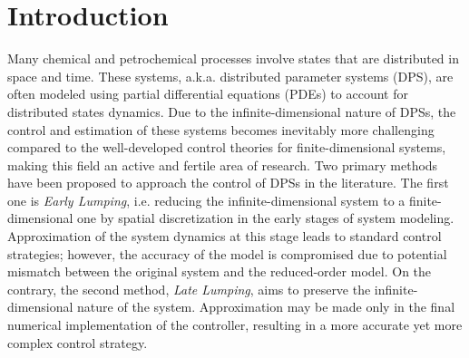 \section{Introduction}

Many chemical and petrochemical processes involve states that are distributed in space and time. These systems, a.k.a. distributed parameter systems (DPS), are often modeled using partial differential equations (PDEs) to account for distributed states dynamics. Due to the infinite-dimensional nature of DPSs, the control and estimation of these systems becomes inevitably more challenging compared to the well-developed control theories for finite-dimensional systems, \cite{ray1981advanced} making this field an active and fertile area of research. Two primary methods have been proposed to approach the control of DPSs in the literature. The first one is \textit{Early Lumping}, i.e. reducing the infinite-dimensional system to a finite-dimensional one by spatial discretization in the early stages of system modeling. \cite{davison1976robust} Approximation of the system dynamics at this stage leads to standard control strategies; however, the accuracy of the model is compromised due to potential mismatch between the original system and the reduced-order model. \cite{moghadam2012infinite} On the contrary, the second method, \textit{Late Lumping}, aims to preserve the infinite-dimensional nature of the system. Approximation may be made only in the final numerical implementation of the controller, resulting in a more accurate yet more complex control strategy.